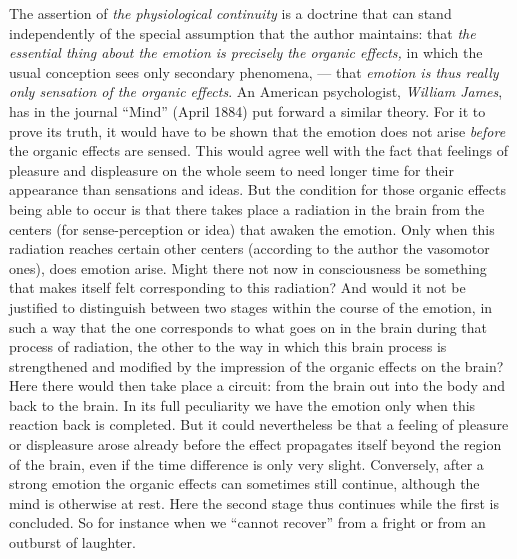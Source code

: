\documentclass[12pt,a4paper,openany]{book}
\newcommand{\opage}[1]{\marginnote{\footnotesize\textit{[#1]}}}
\begin{document}
The assertion of \emph{the physiological continuity} is a doctrine
that can stand independently of the special assumption that
the author maintains: that \emph{the essential thing about the emotion is precisely
the organic effects,} in which the usual conception
sees only secondary phenomena, --- that \emph{emotion is thus really only
sensation of the organic effects}. An American
psychologist, \emph{William James}, has in the journal ``Mind'' (April
1884) put forward a similar theory. For it to prove
its truth, it would have to be shown that the emotion does not
arise \emph{before} the organic effects are sensed. This would
agree well with the fact that feelings of pleasure and displeasure on the whole seem
to need longer time for their appearance than sensations
and ideas. But the condition for those organic
effects being able to occur is that there takes place a radiation
in the brain from the centers (for sense-perception or idea)
that awaken the emotion. Only when this radiation
reaches certain other centers (according to the author the vasomotor ones),
does emotion arise. Might there not now in consciousness
be something that makes itself felt corresponding to this
radiation? And would it not be justified to distinguish
between two stages within the course of the emotion, in such a way
that the one corresponds to what goes on in the brain during that
process of radiation, the other to the way in which this
brain process is strengthened and modified by the impression of the organic
effects on the brain? Here there would then take place
\opage{58}a circuit: from the brain out into the body and back to the brain.
In its full peculiarity we have the emotion only
when this reaction back is completed. But it could
nevertheless be that a feeling of pleasure or displeasure arose already before
the effect propagates itself beyond the region of the brain, even
if the time difference is only very slight. Conversely, after a strong emotion
the organic effects can sometimes still continue, although the mind is otherwise at rest. Here
the second stage thus continues while the first is
concluded. So for instance when we ``cannot recover''
from a fright or from an outburst of laughter.
\end{document}
